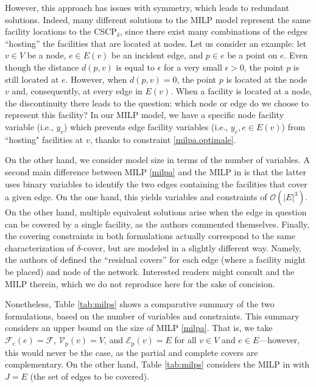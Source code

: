 \documentclass[review]{elsarticle}
\newcommand{\cF}{{\mathcal F}}
\newcommand{\cE}{{\mathcal E}}
\newcommand{\cV}{{\mathcal V}}
\newcommand{\dlt}{{\delta}}
\newcommand{\problem}{CSCP$_\dlt$}
\newcommand{\bO}[1]{{\mathcal{O}(#1)}}
\theoremstyle{definition}
\begin{document}
However, this approach has issues with symmetry, which leads to  redundant solutions. Indeed, many different solutions to the MILP model represent the same facility locations to  the \problem, since there exist many combinations of the edges ``hosting'' the facilities that are located at nodes. Let us consider an example: let $v \in V$ be a node, $e \in E(v)$ be an incident edge, and $p \in e$ be a point on $e$. Even though the distance $d(p,v)$ is equal to $ \epsilon $ for a very small $\epsilon > 0$, the point $p$ is still located at $e$. However, when $d(p,v) = 0$, the point $p$ is located at the node $v$ and, consequently, at every edge in $E(v)$. When a facility is located at a node, the discontinuity there leads to the question: which node or edge do we choose to represent this facility? In our MILP model, we have a specific node facility variable (i.e., $y_v$) which  prevents edge facility variables (i.e., $y_e, e \in E(v)$) from ``hosting" facilities at $v$, thanks to constraint \eqref{milpa.optimale}.


On the other hand, we consider model size in terms of the number of variables.  A second main difference between MILP \eqref{milpa} and the MILP in \cite{Hamacher20} is that the latter uses binary variables to identify the two edges containing the facilities that cover a given edge. On the one hand, this yields variables and constraints of $\bO{|E|^3}$. On the other hand, multiple equivalent solutions arise when the edge in question can be covered by a single facility, as the authors commented themselves. Finally, the covering constraints in both formulations actually correspond to the same characterization of $\dlt$-cover, but are modeled in a slightly different way. Namely, the authors of \cite{Hamacher20} defined the ``residual covers'' for each edge (where a facility might be placed) and node of the network. Interested readers might consult \cite{Hamacher20} and the MILP therein, which we do not reproduce here for the sake of concision.


Nonetheless, Table \ref{tab:milps} shows a comparative summary of the two formulations, based on the number of variables and constraints. This summary considers an upper bound on the size of MILP \eqref{milpa}. That is, we take $\cF_{\mathrm{c}}(e)=\cF$, $\cV_{\mathrm{p}}(v)=V$, and $\cE_{\mathrm{p}}(v)=E$ for all $v \in V$ and $e\in E$---however, this would never be the case, as the partial and complete covers are complementary. On the other hand, Table \ref{tab:milps}  considers the MILP in \cite{Hamacher20} with $J=E$ (the set of edges to be covered).
\end{document}
